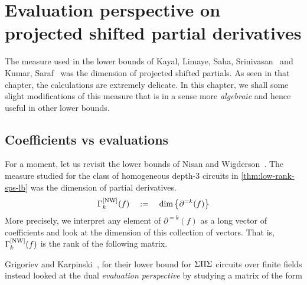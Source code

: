\chapter{Evaluation perspective on projected shifted partial derivatives}

The measure used in the lower bounds of Kayal, Limaye, Saha, Srinivasan~\cite{KLSS} and Kumar, Saraf~\cite{KS14} was the dimension of projected shifted partials.
As seen in that chapter, the calculations are extremely delicate.
In this chapter, we shall some slight modifications of this measure that is in a sense more \emph{algebraic} and hence useful in other lower bounds. 

\section{Coefficients vs evaluations}

For a moment, let us revisit the lower bounds of Nisan and Wigderson~\cite{nw1997}. The measure studied for the class of homogeneous depth-$3$ circuits in \autoref{thm:low-rank-sps-lb} was the dimension of partial derivatives. 
\[
\Gamma^{\mathrm{[NW]}}_k(f) \quad := \quad \dim\left\{\partial^{=k}(f)\right\}
\]
More precisely, we interpret any element of $\partial^{=k}(f)$ as a long vector of coefficients and look at the dimension of this collection of vectors. That is, $\Gamma^{\mathrm{[NW]}}_k(f)$ is the rank of the following matrix. 


Grigoriev and Karpinski~\cite{grigoriev98}, for their lower bound for $\Sigma\Pi\Sigma$ circuits over finite fields instead looked at the dual \emph{evaluation perspective} by studying a matrix of the form

